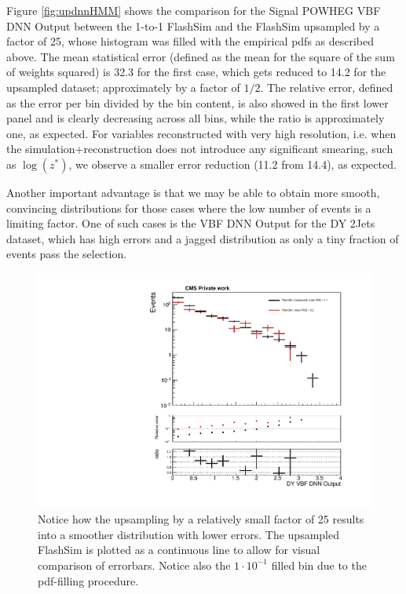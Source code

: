    Figure \ref{fig:updnnHMM} shows the comparison for the Signal POWHEG VBF DNN Output between the 1-to-1 FlashSim and the FlashSim upsampled by a factor of 25, whose histogram was filled with the empirical pdfs as described above. The mean statistical error (defined as the mean for the square of the sum of weights squared) is 32.3 for the first case, which gets reduced to 14.2 for the upsampled dataset; approximately by a factor of $1/2$. The relative error, defined as the error per bin divided by the bin content, is also showed in the first lower panel and is clearly decreasing across all bins, while the ratio is approximately one, as expected. For variables reconstructed with very high resolution, i.e. when the simulation+reconstruction does not introduce any significant smearing, such as $\log(z^*)$, we observe a smaller error reduction (11.2 from 14.4), as expected.
   
   Another important advantage is that we may be able to obtain more smooth, convincing distributions for those cases where the low number of events is a limiting factor. One of such cases is the VBF DNN Output for the DY 2Jets dataset, which has high errors and a jagged distribution as only a tiny fraction of events pass the selection.
   
          \begin{figure}
    \centering
    \includegraphics[width=\linewidth]{gfx/ch6/DY2Jets_DNN18Atan____log_upsampled.pdf}
    \caption[Upsampling on DY]{Notice how the upsampling by a relatively small factor of 25 results into a smoother distribution with lower errors. The upsampled FlashSim is plotted as a continuous line to allow for visual comparison of errorbars. Notice also the $1\cdot 10^{-1}$ filled bin due to the pdf-filling procedure.}
    \label{fig:updnnDY}
   \end{figure}
   
